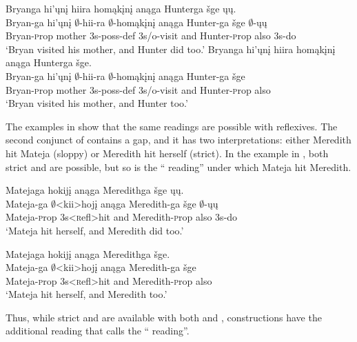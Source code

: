 \documentclass[output=paper]{LSP/langsci}
\begin{document}
\ea\label{ex:johnson:44}
\ea\label{ex:johnson:44a} 
\glll Bryanga hi'ųnį hiira homąkįnį anąga Hunterga šge ųų.\\
Bryan-ga hi'ųnį $\emptyset$-hii-ra $\emptyset$-homąkįnį anąga Hunter-ga šge $\emptyset$-ųų\\
Bryan-{\textsc prop} mother {\textsc 3s-poss-def} {\textsc 3s/o}-visit and Hunter-{\textsc prop} also {\textsc 3s}-do\\
\trans `Bryan visited his mother, and Hunter did too.'
\ex\label{ex:johnson:44b}
\glll Bryanga hi'ųnį hiira homąkįnį anąga Hunterga šge.\\
Bryan-ga hi'ųnį $\emptyset$-hii-ra $\emptyset$-homąkįnį anąga Hunter-ga šge\\
Bryan-{\textsc prop} mother {\textsc 3s-poss-def} {\textsc 3s/o}-visit and Hunter-{\textsc prop} also\\
\trans `Bryan visited his mother, and Hunter too.'
\z
\z

The examples in  show that the same readings are possible with reflexives. The second conjunct of  contains a  gap, and it has two interpretations: either Meredith hit Mateja (sloppy) or Meredith hit herself (strict). In the  example in , both strict and  are possible, but so is the `` reading'' under which Mateja hit Meredith.
 
\ea\label{ex:johnson:45}
\ea\label{ex:johnson:45a} 
\glll Matejaga hokijį anąga Meredithga šge ųų.\\
Mateja-ga $\emptyset$<kii>hojį anąga Meredith-ga šge $\emptyset$-ųų\\
Mateja-{\textsc prop} {\textsc 3s}<{\textsc refl}>hit and Meredith-{\textsc prop} also {\textsc 3s}-do\\
\trans `Mateja hit herself, and Meredith did too.'

\ex\label{ex:johnson:45b}
\glll Matejaga hokijį anąga Meredithga šge.\\
Mateja-ga $\emptyset$<kii>hojį anąga Meredith-ga šge\\ 
Mateja-{\textsc prop} {\textsc 3s}<{\textsc refl}>hit and Meredith-{\textsc prop} also\\ 
\trans `Mateja hit herself, and Meredith too.'
\z
\z

Thus, while strict and  are available with both  and ,  constructions have the additional reading that \citealt{Fortin2007} calls the `` reading''.
\end{document}
